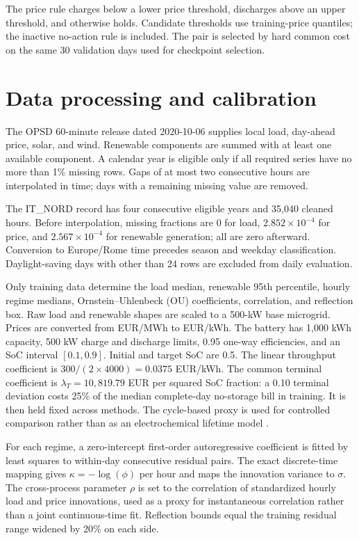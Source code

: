 \documentclass[preprint,11pt]{elsarticle}
\begin{document}
The price rule charges below a lower price threshold, discharges above an
upper threshold, and otherwise holds. Candidate thresholds use training-price
quantiles; the inactive no-action rule is included. The pair is selected by
hard common cost on the same 30 validation days used for checkpoint selection.

\section{Data processing and calibration}

The OPSD 60-minute release dated 2020-10-06 \citep{OPSD2020} supplies local load, day-ahead
price, solar, and wind. Renewable components are summed with at least one
available component. A calendar year is eligible only if all required series
have no more than 1\% missing rows. Gaps of at most two consecutive hours are
interpolated in time; days with a remaining missing value are removed.

The IT\_NORD record has four consecutive eligible years and 35,040 cleaned
hours. Before interpolation, missing fractions are 0 for load,
$2.852\times10^{-4}$ for price, and $2.567\times10^{-4}$ for renewable
generation; all are zero afterward. Conversion to Europe/Rome time precedes
season and weekday classification. Daylight-saving days with other than 24
rows are excluded from daily evaluation.

Only training data determine the load median, renewable 95th percentile,
hourly regime medians, Ornstein--Uhlenbeck (OU) coefficients, correlation, and
reflection box. Raw
load and renewable shapes are scaled to a 500-kW base microgrid. Prices are
converted from EUR/MWh to EUR/kWh. The battery has 1,000 kWh capacity, 500 kW
charge and discharge limits, 0.95 one-way efficiencies, and an SoC interval
$[0.1,0.9]$. Initial and target SoC are 0.5. The linear throughput coefficient
is $300/(2\times4000)=0.0375$ EUR/kWh. The common terminal coefficient is
$\lambda_T=10{,}819.79$ EUR per squared SoC fraction: a 0.10 terminal
deviation costs 25\% of the median complete-day no-storage bill in training.
It is then held fixed across methods. The cycle-based proxy is used for
controlled comparison rather than as an electrochemical lifetime model
\citep{Xu2018}.

For each regime, a zero-intercept first-order autoregressive coefficient is fitted by least squares
to within-day consecutive residual pairs. The exact discrete-time mapping gives
$\kappa=-\log(\phi)$ per hour and maps the innovation variance to $\sigma$.
The cross-process parameter $\rho$ is set to the correlation of standardized
hourly load and price innovations, used as a proxy for instantaneous
correlation rather than a joint continuous-time fit. Reflection bounds equal the
training residual range widened by 20\% on each side.
\end{document}
